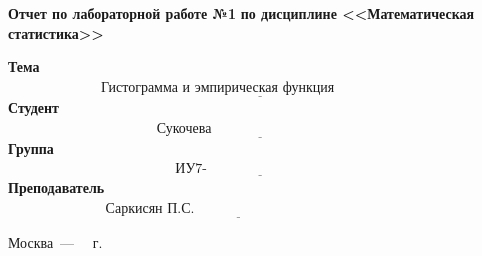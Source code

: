 \begin{titlepage}
	\begin{center}
		\noindent\begin{minipage}{1.1\textwidth}\centering
			\Large\textbf{  Отчет по лабораторной работе №1}\newline
			\textbf{по дисциплине <<Математическая статистика>>}\newline\newline
		\end{minipage}
	\end{center}
	
	\noindent\textbf{Тема} $\underline{\text{~~~~~~~~~~~~~~~~~~~~Гистограмма и эмпирическая функция распределения~~~~~~~~~~~~~~~~~~~~~}}$\newline\newline
	\noindent\textbf{Студент} $\underline{\text{~~~~~~~~~~~~~~~~~~~~~~~~~~~~~~~~Сукочева А.~~~~~~~~~~~~~~~~~~~~~~~~~~~~~~~~~~~~~~~~~~~~~~~~~~~~~~~~~~~~~~}}$\newline\newline
	\noindent\textbf{Группа} $\underline{\text{~~~~~~~~~~~~~~~~~~~~~~~~~~~~~~~~~~~~ИУ7-63Б~~~~~~~~~~~~~~~~~~~~~~~~~~~~~~~~~~~~~~~~~~~~~~~~~~~~~~~~~~~~~~~~~}}$\newline\newline
	\noindent\textbf{Преподаватель} $\underline{\text{~~~~~~~~~~~~~~~~~~~~~Саркисян П.С.~~~~~~~~~~~~~~~~~~~~~~~~~~~~~~~~~~~~~~~~~~~~~~~~~~~~~~~~~~~}}$\newline\newline\newline
	
\begin{center}
	\vfill
	Москва~---~\the\year
	~г.
\end{center}

\end{titlepage}